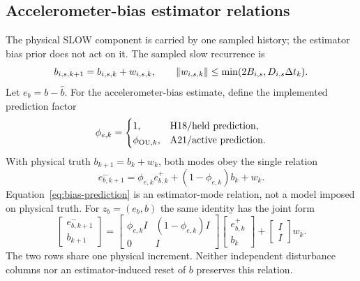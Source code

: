 \documentclass[journal]{IEEEtran}
\begin{document}
\subsection{Accelerometer-bias estimator relations}
The physical SLOW component is carried by one sampled history; the estimator
bias prior does not act on it. The sampled
slow recurrence is
\begin{equation}
 b_{i,s,k+1}=b_{i,s,k}+w_{i,s,k},\qquad
 \left\lVert w_{i,s,k}\right\rVert\le\min(2B_{i,s},D_{i,s}\Delta t_k).
 \label{eq:bias-discrete}
\end{equation}
Let $e_b=b-\hat b$. For the accelerometer-bias estimate, define the implemented
prediction factor
\begin{equation}
 \phi_{e,k}=
 \begin{cases}
 1,&\text{H18/held prediction},\\
 \phi_{{\rm OU},k},&\text{A21/active prediction}.
 \end{cases}
 \label{eq:phi-mode}
\end{equation}
With physical truth $b_{k+1}=b_k+w_k$, both modes obey the single relation
\begin{equation}
 \boxed{
 e_{b,k+1}^{-}=
 \phi_{e,k}e_{b,k}^{+}+
 (1-\phi_{e,k})b_k+w_k .}
 \label{eq:bias-prediction}
\end{equation}
Equation~\eqref{eq:bias-prediction} is an estimator-mode relation, not a model
imposed on physical truth.
For $z_b=(e_b,b)$ the same identity has the joint form
\begin{equation}
 \begin{bmatrix}e_{b,k+1}^{-}\\b_{k+1}\end{bmatrix}
 =\begin{bmatrix}\phi_{e,k}I&(1-\phi_{e,k})I\\0&I\end{bmatrix}
 \begin{bmatrix}e_{b,k}^{+}\\b_k\end{bmatrix}
 +\begin{bmatrix}I\\I\end{bmatrix}w_k.
 \label{eq:bias-joint}
\end{equation}
The two rows share one physical increment. Neither independent disturbance
columns nor an estimator-induced reset of $b$ preserves this relation.
\end{document}
